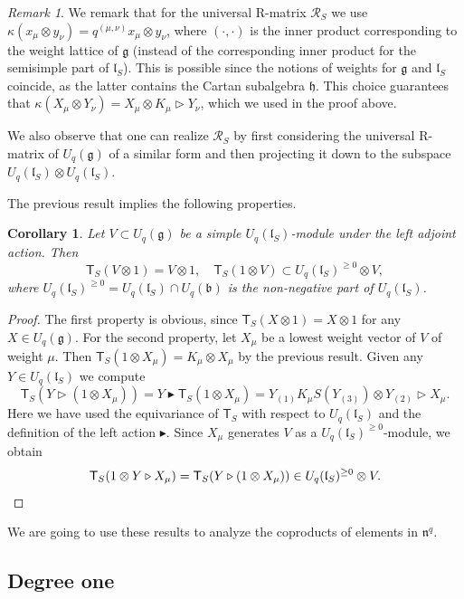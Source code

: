 \documentclass[a4paper, 12pt, reqno, english]{amsart}
\numberwithin{equation}{section}
\numberwithin{figure}{section}
\theoremstyle{plain}
\theoremstyle{plain}
\theoremstyle{plain}
\theoremstyle{plain}
\theoremstyle{plain}
\newtheorem{corollary}[theorem]{Corollary}
\theoremstyle{definition}
\theoremstyle{definition}
\theoremstyle{definition}
\theoremstyle{remark}
\newtheorem{remark}[theorem]{Remark}
\theoremstyle{definition}
\theoremstyle{definition}
\newcommand{\Uqb}{U_q(\mathfrak{b})}
\newcommand{\Uqg}{U_q(\mathfrak{g})}
\newcommand{\UqlS}{U_q(\mathfrak{l}_S)}
\newcommand{\lieg}{\mathfrak{g}}
\newcommand{\lieh}{\mathfrak{h}}
\newcommand{\liel}{\mathfrak{l}}
\newcommand{\lien}{\mathfrak{n}}
\newcommand{\calR}{\mathcal{R}}
\newcommand{\tmapS}{\mathsf{T}_S}
\newcommand{\qnil}{\lien^q}
\begin{document}
\begin{remark}
We remark that for the universal R-matrix $\calR_S$ we use $\kappa(x_\mu \otimes y_\nu) = q^{(\mu, \nu)} x_\mu \otimes y_\nu$, where $(\cdot, \cdot)$ is the inner product corresponding to the weight lattice of $\lieg$ (instead of the corresponding inner product for the semisimple part of $\liel_S$).
This is possible since the notions of weights for $\lieg$ and $\liel_S$ coincide, as the latter contains the Cartan subalgebra $\lieh$.
This choice guarantees that $\kappa (X_\mu \otimes Y_\nu) = X_\mu \otimes K_\mu \triangleright Y_\nu$, which we used in the proof above.

We also observe that one can realize $\calR_S$ by first considering the universal R-matrix of $\Uqg$ of a similar form and then projecting it down to the subspace $\UqlS \otimes \UqlS$.
\end{remark}

The previous result implies the following properties.

\begin{corollary}
\label{cor:action-T-simple}
Let $V \subset \Uqg$ be a simple $\UqlS$-module under the left adjoint action. Then
\[
\tmapS(V \otimes 1) = V \otimes 1, \quad
\tmapS(1 \otimes V) \subset \UqlS^{\geq 0} \otimes V,
\]
where $\UqlS^{\geq 0} = \UqlS \cap \Uqb$ is the non-negative part of $\UqlS$.
\end{corollary}

\begin{proof}
The first property is obvious, since $\tmapS(X \otimes 1) = X \otimes 1$ for any $X \in \Uqg$.
For the second property, let $X_\mu$ be a lowest weight vector of $V$ of weight $\mu$.
Then $\tmapS(1 \otimes X_\mu) = K_\mu \otimes X_\mu$ by the previous result.
Given any $Y \in \UqlS$ we compute
\[
\tmapS(Y \triangleright (1 \otimes X_\mu))
= Y \blacktriangleright \tmapS(1 \otimes X_\mu)
= Y_{(1)} K_\mu S(Y_{(3)}) \otimes Y_{(2)} \triangleright X_\mu.
\]
Here we have used the equivariance of $\tmapS$ with respect to $\UqlS$ and the definition of the left action $\blacktriangleright$.
Since $X_\mu$ generates $V$ as a $\UqlS^{\geq 0}$-module, we obtain
\[
\tmapS(1 \otimes Y \triangleright X_\mu)
= \tmapS(Y \triangleright (1 \otimes X_\mu))
\in \UqlS^{\geq 0} \otimes V. \qedhere
\]
\end{proof}

We are going to use these results to analyze the coproducts of elements in $\qnil$.

\subsection{Degree one}
\end{document}
